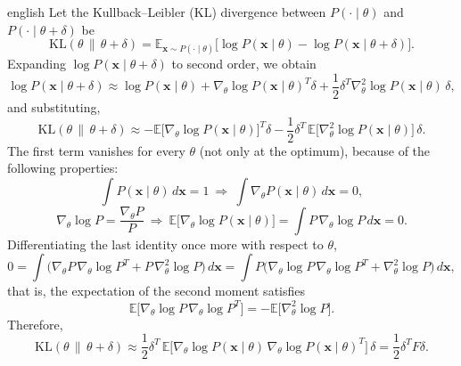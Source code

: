 \documentclass[0000.tex]{subfiles}
\begin{document}
\begin{hyphenrules}{english}
Let the Kullback--Leibler (KL) divergence between $P(\cdot\mid\theta)$ and $P(\cdot\mid\theta+\delta)$ be
\cite{pascanu2013}
\[
  \mathrm{KL}(\theta\,\|\,\theta+\delta)=\mathbb{E}_{\mathbf{x}\sim P(\cdot\mid\theta)}\big[\log P(\mathbf{x}\mid\theta)-\log P(\mathbf{x}\mid\theta+\delta)\big].
\]
Expanding $\log P(\mathbf{x}\mid\theta+\delta)$ to second order, we obtain
\[
  \log P(\mathbf{x}\mid\theta+\delta)\approx\log P(\mathbf{x}\mid\theta)+\nabla_\theta\log P(\mathbf{x}\mid\theta)^{T}\delta
  +\frac12\delta^{T}\nabla^2_\theta\log P(\mathbf{x}\mid\theta)\,\delta,
\]
and substituting,
\begin{equation}
  \mathrm{KL}(\theta\,\|\,\theta+\delta)\approx-\mathbb{E}\big[\nabla_\theta\log P(\mathbf{x}\mid\theta)\big]^{T}\delta
  -\frac12\delta^{T}\,\mathbb{E}\big[\nabla^2_\theta\log P(\mathbf{x}\mid\theta)\big]\,\delta.
  \label{eq:app-kl}
\end{equation}
The first term vanishes for every $\theta$ (not only at the optimum), because of the following properties:
\[
  \int P(\mathbf{x}\mid\theta)\,d\mathbf{x}=1\ \Rightarrow\ \int\nabla_\theta P(\mathbf{x}\mid\theta)\,d\mathbf{x}=0,
\]
\[
  \nabla_\theta\log P=\frac{\nabla_\theta P}{P}\ \Rightarrow\
  \mathbb{E}\big[\nabla_\theta\log P(\mathbf{x}\mid\theta)\big]=\int P\,\nabla_\theta\log P\,d\mathbf{x}=0.
\]
Differentiating the last identity once more with respect to $\theta$,
\[
  0=\int\Big(\nabla_\theta P\,\nabla_\theta\log P^{T}+P\,\nabla^2_\theta\log P\Big)\,d\mathbf{x}
   =\int P\Big(\nabla_\theta\log P\,\nabla_\theta\log P^{T}+\nabla^2_\theta\log P\Big)\,d\mathbf{x},
\]
that is, the expectation of the second moment satisfies
\[
  \mathbb{E}\big[\nabla_\theta\log P\,\nabla_\theta\log P^{T}\big]=-\mathbb{E}\big[\nabla^2_\theta\log P\big].
\]
Therefore,
\[
  \mathrm{KL}(\theta\,\|\,\theta+\delta)\approx\frac12\delta^{T}\,
  \mathbb{E}\big[\nabla_\theta\log P(\mathbf{x}\mid\theta)\,\nabla_\theta\log P(\mathbf{x}\mid\theta)^{T}\big]\,\delta
  =\frac12\delta^{T}F\delta.
\]

\end{hyphenrules}

\ifSubfilesClassLoaded{}{}
\end{document}
